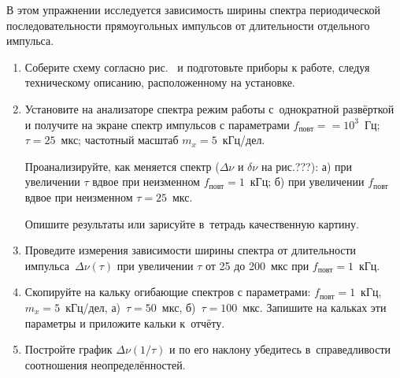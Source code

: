 \begin{lab:task}

В этом упражнении исследуется зависимость ширины спектра периодической последовательности прямоугольных импульсов от длительности отдельного импульса.

\begin{enumerate}
	\item Соберите схему согласно рис.~ и подготовьте приборы к работе, следуя техническому описанию, расположенному на установке.
	\item Установите на анализаторе спектра режим работы с~однократной
    развёрткой и получите на экране спектр импульсов с параметрами
    $f_\text{повт}==10^3$~Гц; $\tau=25$~мкс; частотный масштаб $m_x=5$~кГц/дел.

	Проанализируйте, как меняется спектр ($\Delta\nu$ и $\delta\nu$ на рис.???):
	а) при увеличении $\tau$ вдвое при неизменном $f_\text{повт}=1$~кГц;
	б) при увеличении $f_\text{повт}$ вдвое при неизменном $\tau=25$~мкс.

	Опишите результаты или зарисуйте в~тетрадь качественную картину.
	\item Проведите измерения зависимости ширины спектра от длительности импульса~$\Delta \nu(\tau)$ при увеличении $\tau$ от 25 до 200~мкс при $f_\text{повт}=1$~кГц.
	\item Скопируйте на кальку  огибающие спектров с параметрами: $f_\text{повт}=1$~кГц, $m_x=5$~кГц/дел, а)~$\tau=50$~мкс, б)~$\tau=100$~мкс. Запишите на кальках эти параметры и приложите кальки к~отчёту.
	\item Постройте график $\Delta \nu(1/\tau)$ и по его наклону убедитесь в~справедливости соотношения неопределённостей.
\end{enumerate}
\end{lab:task}



